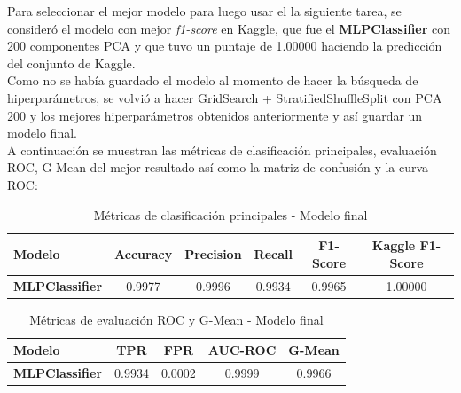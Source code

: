 \documentclass{article}
\begin{document}
Para seleccionar el mejor modelo para luego usar el la siguiente tarea, se consideró el modelo con mejor \textit{f1-score} en Kaggle, que fue el \textbf{MLPClassifier} con 200 componentes PCA y que tuvo un puntaje de 1.00000 haciendo la predicción del conjunto de Kaggle.\\

Como no se había guardado el modelo al momento de hacer la búsqueda de hiperparámetros, se volvió a hacer GridSearch + StratifiedShuffleSplit con PCA 200 y los mejores hiperparámetros obtenidos anteriormente y así guardar un modelo final.\\

A continuación se muestran las métricas de clasificación principales, evaluación ROC, G-Mean del mejor resultado así como la matriz de confusión y la curva ROC:

\begin{table}[H]
    \centering
    \begin{tabular}{|l|c|c|c|c|c|}
    \hline
    \rowcolor{tableblue} \textbf{Modelo} & \textbf{Accuracy} & \textbf{Precision} & \textbf{Recall} & \textbf{F1-Score} & \textbf{Kaggle F1-Score} \\
    \hline
    \rowcolor{purple!30} \textbf{MLPClassifier} & 0.9977 & 0.9996 & 0.9934 & 0.9965 & 1.00000 \\
    \hline
    \end{tabular}
    \caption{Métricas de clasificación principales - Modelo final}
    \label{tab:metricas_final}
\end{table}

\begin{table}[H]
    \centering
    \begin{tabular}{|l|c|c|c|c|}
    \hline
    \rowcolor{tableblue} \textbf{Modelo} & \textbf{TPR} & \textbf{FPR} & \textbf{AUC-ROC} & \textbf{G-Mean} \\
    \hline
    \rowcolor{purple!30} \textbf{MLPClassifier} & 0.9934 & 0.0002 & 0.9999 & 0.9966 \\
    \hline
    \end{tabular}
    \caption{Métricas de evaluación ROC y G-Mean - Modelo final}
    \label{tab:metricas_roc_final}
\end{table}
\end{document}
